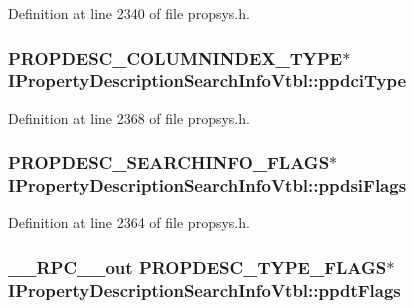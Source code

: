 Definition at line 2340 of file propsys.\+h.

\subsubsection[{\texorpdfstring{ppdci\+Type}{ppdciType}}]{ {\bf P\+R\+O\+P\+D\+E\+S\+C\+\_\+\+C\+O\+L\+U\+M\+N\+I\+N\+D\+E\+X\+\_\+\+T\+Y\+PE}$\ast$ I\+Property\+Description\+Search\+Info\+Vtbl\+::ppdci\+Type}\hypertarget{struct_i_property_description_search_info_vtbl_aae176da4cccadf20e8779e5fc50584ce}{}\label{struct_i_property_description_search_info_vtbl_aae176da4cccadf20e8779e5fc50584ce}


Definition at line 2368 of file propsys.\+h.

\subsubsection[{\texorpdfstring{ppdsi\+Flags}{ppdsiFlags}}]{ {\bf P\+R\+O\+P\+D\+E\+S\+C\+\_\+\+S\+E\+A\+R\+C\+H\+I\+N\+F\+O\+\_\+\+F\+L\+A\+GS}$\ast$ I\+Property\+Description\+Search\+Info\+Vtbl\+::ppdsi\+Flags}\hypertarget{struct_i_property_description_search_info_vtbl_a282d7c2e32b252001203ed93698d70b6}{}\label{struct_i_property_description_search_info_vtbl_a282d7c2e32b252001203ed93698d70b6}


Definition at line 2364 of file propsys.\+h.

\subsubsection[{\texorpdfstring{ppdt\+Flags}{ppdtFlags}}]{ {\bf \+\_\+\+\_\+\+R\+P\+C\+\_\+\+\_\+out} {\bf P\+R\+O\+P\+D\+E\+S\+C\+\_\+\+T\+Y\+P\+E\+\_\+\+F\+L\+A\+GS}$\ast$ I\+Property\+Description\+Search\+Info\+Vtbl\+::ppdt\+Flags}\hypertarget{struct_i_property_description_search_info_vtbl_a75e6171640d4b0e862d54d86fbcafbb0}{}\label{struct_i_property_description_search_info_vtbl_a75e6171640d4b0e862d54d86fbcafbb0}


